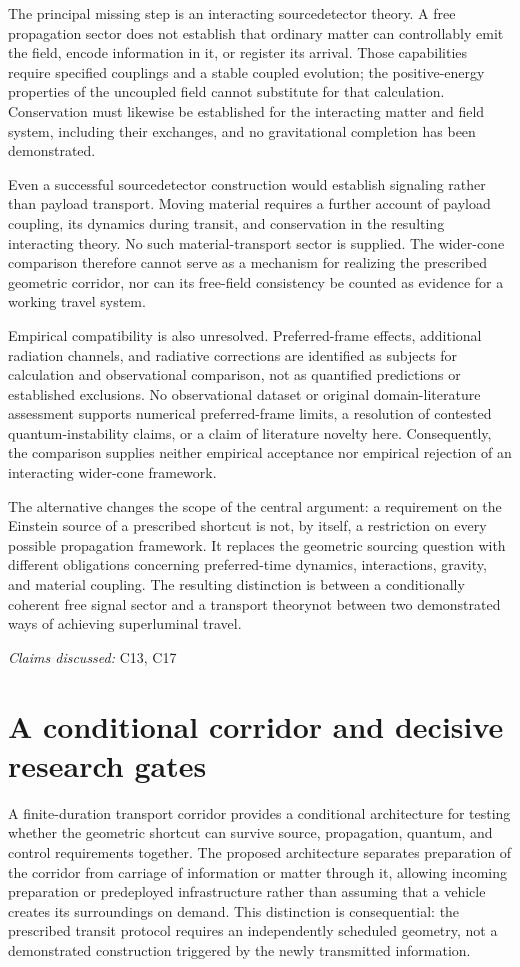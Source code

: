 \documentclass[11pt]{article}
\begin{document}
The principal missing step is an interacting source\textendash{}detector theory. A free propagation sector does not establish that ordinary matter can controllably emit the field, encode information in it, or register its arrival. Those capabilities require specified couplings and a stable coupled evolution; the positive-energy properties of the uncoupled field cannot substitute for that calculation. Conservation must likewise be established for the interacting matter and field system, including their exchanges, and no gravitational completion has been demonstrated.

Even a successful source\textendash{}detector construction would establish signaling rather than payload transport. Moving material requires a further account of payload coupling, its dynamics during transit, and conservation in the resulting interacting theory. No such material-transport sector is supplied. The wider-cone comparison therefore cannot serve as a mechanism for realizing the prescribed geometric corridor, nor can its free-field consistency be counted as evidence for a working travel system.

Empirical compatibility is also unresolved. Preferred-frame effects, additional radiation channels, and radiative corrections are identified as subjects for calculation and observational comparison, not as quantified predictions or established exclusions. No observational dataset or original domain-literature assessment supports numerical preferred-frame limits, a resolution of contested quantum-instability claims, or a claim of literature novelty here. Consequently, the comparison supplies neither empirical acceptance nor empirical rejection of an interacting wider-cone framework.

The alternative changes the scope of the central argument: a requirement on the Einstein source of a prescribed shortcut is not, by itself, a restriction on every possible propagation framework. It replaces the geometric sourcing question with different obligations concerning preferred-time dynamics, interactions, gravity, and material coupling. The resulting distinction is between a conditionally coherent free signal sector and a transport theory\textemdash{}not between two demonstrated ways of achieving superluminal travel.

\textit{Claims discussed: }C13, C17
\section{A conditional corridor and decisive research gates}
A finite-duration transport corridor provides a conditional architecture for testing whether the geometric shortcut can survive source, propagation, quantum, and control requirements together. The proposed architecture separates preparation of the corridor from carriage of information or matter through it, allowing incoming preparation or predeployed infrastructure rather than assuming that a vehicle creates its surroundings on demand. This distinction is consequential: the prescribed transit protocol requires an independently scheduled geometry, not a demonstrated construction triggered by the newly transmitted information.
\end{document}
